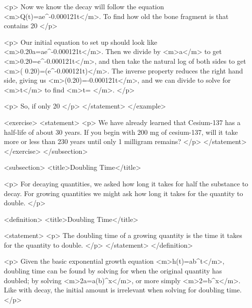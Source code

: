                 <p>
                    Now we know the decay will follow the equation <m>Q(t)=ae^{-0.000121t}</m>.
                    To find how old the bone fragment is that contains 20%
                </p>

                <p>
                    Our initial equation to set up should look like <m>0.20a=ae^{-0.000121t}</m>.
                    Then we divide by <m>a</m> to get <m>0.20=e^{-0.000121t}</m>, and then take the natural log of both sides to get <m>\ln( 0.20)=\ln(e^{-0.000121t})</m>.
                    The inverse property reduces the right hand side, giving us <m>\ln(0.20)=-0.000121t</m>, and we can divide to solve for <m>t</m> to find <m>t= </m>.
                </p>

                <p>
                    So, if only 20%
                </p>
            </statement>
        </example>

        <exercise>
            <statement>
                <p>
                    We have already learned that Cesium-137 has a half-life of about 30 years.
                    If you begin with 200 mg of cesium-137, will it take more or less than 230 years until only 1 milligram remains?
                </p>
            </statement>
        </exercise>
    </subsection>


    <subsection>
        <title>Doubling Time</title>

        <p>
            For decaying quantities, we asked how long it takes for half the substance to decay.
            For growing quantities we might ask how long it takes for the quantity to double.
        </p>

        <definition>
            <title>Doubling Time</title>

            <statement>
                <p>
                    The doubling time of a growing quantity is the time it takes for the quantity to double.
                </p>
            </statement>
        </definition>

        <p>
            Given the basic exponential growth equation <m>h(t)=ab^{t}</m>, doubling time can be found by solving for when the original quantity has doubled; by solving <m>2a=a(b)^{x}</m>, or more simply <m>2=b^{x}</m>.
            Like with decay, the initial amount is irrelevant when solving for doubling time.
        </p>

